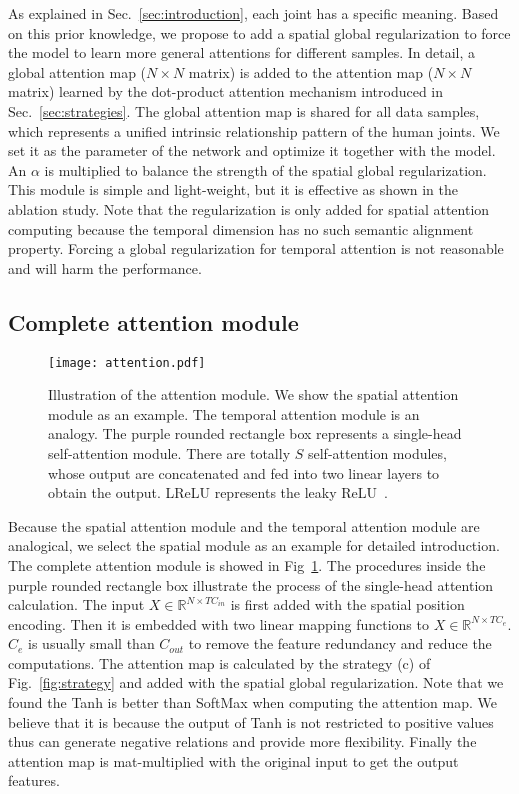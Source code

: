 \documentclass[runningheads]{llncs}
\begin{document}
As explained in Sec.~\ref{sec:introduction}, each joint has a specific meaning. 
Based on this prior knowledge, we propose to add a spatial global regularization to force the model to learn more general attentions for different samples.
In detail, a global attention map ($N\times N$ matrix) is added to the attention map ($N\times N$ matrix) learned by the dot-product attention mechanism introduced in Sec.~\ref{sec:strategies}. 
The global attention map is shared for all data samples, which represents a unified intrinsic relationship pattern of the human joints. 
We set it as the parameter of the network and optimize it together with the model. 
An $\alpha$ is multiplied to balance the strength of the spatial global regularization. 
This module is simple and light-weight, but it is effective as shown in the ablation study. 
Note that the regularization is only added for spatial attention computing because the temporal dimension has no such semantic alignment property. 
Forcing a global regularization for temporal attention is not reasonable and will harm the performance. 

\subsection{Complete attention module}
\label{sec:attention}

\begin{figure}[tp]
    \centering
    \texttt{[image: attention.pdf]}
    \caption{Illustration of the attention module. We show the spatial attention module as an example. The temporal attention module is an analogy. The purple rounded rectangle box represents a single-head self-attention module. There are totally $S$ self-attention modules, whose output are concatenated and fed into two linear layers to obtain the output. LReLU represents the leaky ReLU~\cite{maas_rectifier_2013}.}
    \label{fig:attention}
\end{figure}{}

Because the spatial attention module and the temporal attention module are analogical, we select the spatial module as an example for detailed introduction. 
The complete attention module is showed in Fig~\ref{fig:attention}. 
The procedures inside the purple rounded rectangle box illustrate the process of the single-head attention calculation. 
The input $X\in\mathbb{R}^{N\times TC_{in}}$ is first added with the spatial position encoding. 
Then it is embedded with two linear mapping functions to $X\in\mathbb{R}^{N\times TC_{e}}$. 
$C_e$ is usually small than $C_{out}$ to remove the feature redundancy and reduce the computations.
The attention map is calculated by the strategy (c) of Fig.~\ref{fig:strategy} and added with the spatial global regularization. 
Note that we found the Tanh is better than SoftMax when computing the attention map. 
We believe that it is because the output of Tanh is not restricted to positive values thus can generate negative relations and provide more flexibility. 
Finally the attention map is mat-multiplied with the original input to get the output features. 
\end{document}
